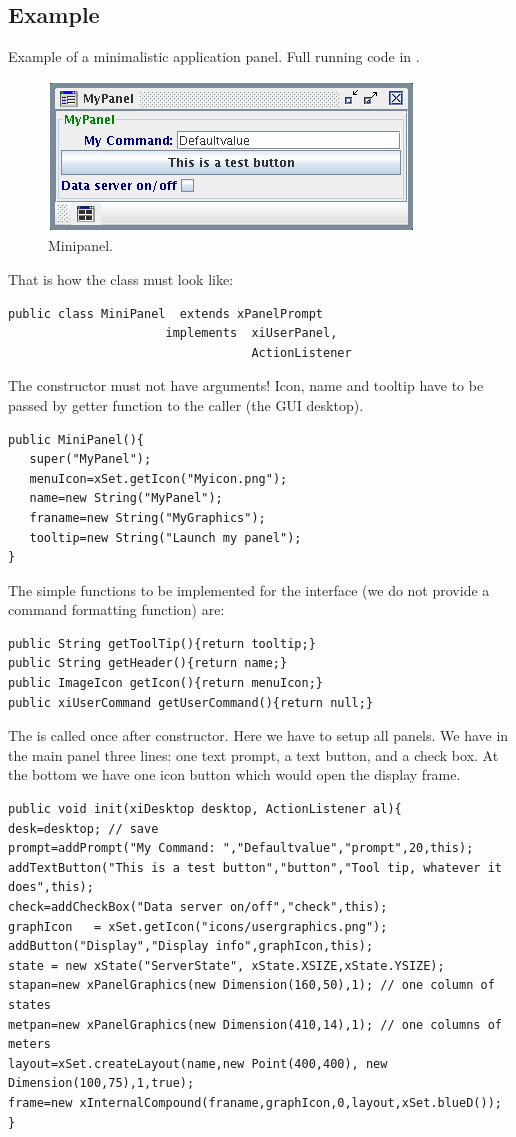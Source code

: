 \subsection{Example}
Example of a minimalistic application panel.
Full running code in .
\begin{figure}[htb]
\centering\includegraphics[angle=0,width=.6\textwidth]{prog-minipanel.png} %
\caption{Minipanel.}
\label{fig:prog-minipanel} %
\end{figure}
That is how the class must look like:
{\small \begin{verbatim}
public class MiniPanel  extends xPanelPrompt
                      implements  xiUserPanel,
                                  ActionListener 
\end{verbatim}
}
The constructor must not have arguments! Icon, name and tooltip have to be
passed by getter function to the caller (the GUI desktop).
{\small \begin{verbatim}
public MiniPanel(){
   super("MyPanel");
   menuIcon=xSet.getIcon("Myicon.png");
   name=new String("MyPanel");
   franame=new String("MyGraphics");
   tooltip=new String("Launch my panel");
}
\end{verbatim}
}
The simple functions to be implemented for the interface 
(we do not provide a command formatting function) are:
{\small \begin{verbatim}
public String getToolTip(){return tooltip;}
public String getHeader(){return name;}
public ImageIcon getIcon(){return menuIcon;}
public xiUserCommand getUserCommand(){return null;}
\end{verbatim}
}
The  is called once after constructor. Here we have to setup all panels.
We have in the main panel three lines: one text prompt, a text button, and a check box.
At the bottom we have one icon button which would open the display frame.
{\small \begin{verbatim}
public void init(xiDesktop desktop, ActionListener al){
desk=desktop; // save
prompt=addPrompt("My Command: ","Defaultvalue","prompt",20,this);
addTextButton("This is a test button","button","Tool tip, whatever it does",this);
check=addCheckBox("Data server on/off","check",this);
graphIcon   = xSet.getIcon("icons/usergraphics.png");
addButton("Display","Display info",graphIcon,this);
state = new xState("ServerState", xState.XSIZE,xState.YSIZE);
stapan=new xPanelGraphics(new Dimension(160,50),1); // one column of states
metpan=new xPanelGraphics(new Dimension(410,14),1); // one columns of meters
layout=xSet.createLayout(name,new Point(400,400), new Dimension(100,75),1,true);
frame=new xInternalCompound(franame,graphIcon,0,layout,xSet.blueD());
}
\end{verbatim}
}
